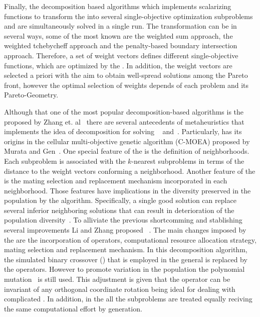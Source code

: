 %
Finally, the decomposition based algorithms which implements scalarizing functions to transform the \MOP{} into several single-objective optimization subproblems and are simultaneously solved in a single run.
%
The transformation can be in several ways, some of the most known are the weighted sum approach, the weighted tchebycheff approach and the penalty-based boundary intersection approach.
%
Therefore, a set of weight vectors defines different single-objective functions, which are optimized by the \MOEA{}.
%
In addition, the weight vectors are selected a priori with the aim to obtain well-spread solutions among the Pareto front, however the optimal selection of weights depends of each problem and its Pareto-Geometry.
%


Although that one of the most popular decomposition-based algorithms is the \MOEAD{} proposed by Zhang et. al~\cite{zhang2007moea} there are several antecedents of metaheuristics that implements the idea of decomposition for solving \MOPS{}~\cite{ishibuchi1998multi} and~\cite{murata2002cellular}.
%
Particularly, \MOEAD{} has its origins in the cellular multi-objective genetic algorithm (C-MOEA) proposed by Murata and Gen~\cite{murata2002cellular}.
%
One special feature of the \MOEAD{} is the definition of neighborhoods.
%
Each subproblem is associated with the $k$-nearest subproblems in terms of the distance to the weight vectors conforming a neighborhood.
%
Another feature of the \MOEAD{} is the mating selection and replacement mechanism incorporated in each neighborhood.
%
Those features have implications in the diversity preserved in the population by the algorithm.
%
Specifically, a single good solution can replace several inferior neighboring solutions that can result in deterioration of the population diversity~\cite{wang2015constrained}.
%
To alliviate the previous shortcomming and stablishing several improvements Li and Zhang proposed \MOEADDE{}~\cite{li2009multiobjective}.
%
The main changes imposed by the \MOEADDE{} are the incorporation of \DE{} operators, computational resource allocation strategy, mating selection and replacement mechanism.
%
In this decomposition algorithm, the simulated binary crossover (\SBX{}) that is employed in the general \MOEAD{} is replaced by the \DE{} operators.
%
However to promote variation in the population the polynomial mutation~\cite{deb2001multi} is still used.
%
This adjustment is given that the \DE{} operator can be invariant of any orthogonal coordinate rotation being ideal for dealing with complicated \PS{}.
%
In addition, in the \MOEAD{} all the subproblems are treated equally reciving the same computational effort by generation.
